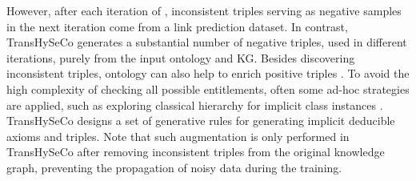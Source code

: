 \documentclass[sigconf]{acmart}
\newcommand{\TransHI}{TransHySeCo\xspace}
\begin{document}
 However, %
 after each iteration  of \cite{paperiterative}, %
   inconsistent triples serving as negative samples in the next iteration come from a link prediction dataset.
In contrast, \TransHI %
generates a substantial number of  negative triples, used in different iterations,  purely from %
the input ontology and KG. 
Besides discovering inconsistent triples,   ontology can  also help  to enrich positive triples \cite{transrowl}.
To avoid the high complexity of checking all possible entitlements, often some ad-hoc strategies are applied, such as exploring classical hierarchy for implicit class instances \cite{transrowl}. \TransHI designs a set of generative rules for generating implicit deducible axioms and triples. Note that such augmentation is only performed in \TransHI after removing inconsistent triples from the original knowledge graph, preventing the propagation of noisy data during the training. 

\end{document}
